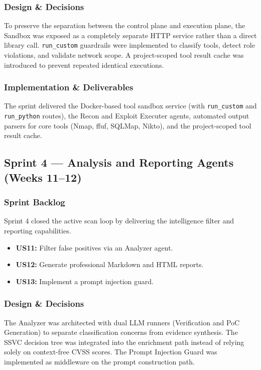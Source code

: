 \documentclass[12pt,a4paper]{report}
\begin{document}
\subsubsection{Design \& Decisions}
To preserve the separation between the control plane and execution plane, the Sandbox was exposed as a completely separate HTTP service rather than a direct library call. \texttt{run\_custom} guardrails were implemented to classify tools, detect role violations, and validate network scope. A project-scoped tool result cache was introduced to prevent repeated identical executions.

\subsubsection{Implementation \& Deliverables}
The sprint delivered the Docker-based tool sandbox service (with \texttt{run\_custom} and \texttt{run\_python} routes), the Recon and Exploit Executer agents, automated output parsers for core tools (Nmap, ffuf, SQLMap, Nikto), and the project-scoped tool result cache.

\subsection{Sprint 4 --- Analysis and Reporting Agents (Weeks 11--12)}

\subsubsection{Sprint Backlog}
Sprint 4 closed the active scan loop by delivering the intelligence filter and reporting capabilities.
\begin{itemize}
    \item \textbf{US11:} Filter false positives via an Analyzer agent.
    \item \textbf{US12:} Generate professional Markdown and HTML reports.
    \item \textbf{US13:} Implement a prompt injection guard.
\end{itemize}

\subsubsection{Design \& Decisions}
The Analyzer was architected with dual LLM runners (Verification and PoC Generation) to separate classification concerns from evidence synthesis. The SSVC decision tree was integrated into the enrichment path instead of relying solely on context-free CVSS scores. The Prompt Injection Guard was implemented as middleware on the prompt construction path.
\end{document}
